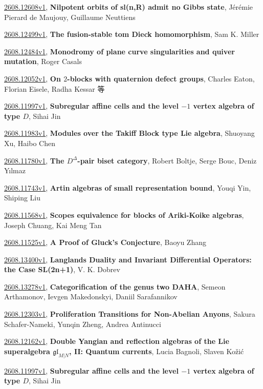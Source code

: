 \documentclass[9pt, a4paper]{article}
\theoremstyle{plain}
\theoremstyle{definition}
\theoremstyle{remark}
\newcommand{\arxiv}[3]{\href{https://arxiv.org/abs/#1}{#1}, \textbf{\textcolor{arxivblue}{#2}}, #3}
\begin{document}
\arxiv{2608.12608v1}{Nilpotent orbits of sl(n,R) admit no Gibbs state}{Jérémie Pierard de Maujouy, Guillaume Neuttiens}

\arxiv{2608.12499v1}{The fusion-stable tom Dieck homomorphism}{Sam K. Miller}

\arxiv{2608.12484v1}{Monodromy of plane curve singularities and quiver mutation}{Roger Casals}

\arxiv{2608.12052v1}{On $2$-blocks with quaternion defect groups}{Charles Eaton, Florian Eisele, Radha Kessar 等}

\arxiv{2608.11997v1}{Subregular affine cells and the level $-1$ vertex algebra of type $D$}{Sihai Jin}

\arxiv{2608.11983v1}{Modules over the Takiff Block type Lie algebra}{Shuoyang Xu, Haibo Chen}

\arxiv{2608.11780v1}{The $D^Δ$-pair biset category}{Robert Boltje, Serge Bouc, Deniz Yılmaz}

\arxiv{2608.11743v1}{Artin algebras of small representation bound}{Youqi Yin, Shiping Liu}

\arxiv{2608.11568v1}{Scopes equivalence for blocks of Ariki-Koike algebras}{Joseph Chuang, Kai Meng Tan}

\arxiv{2608.11525v1}{A Proof of Gluck's Conjecture}{Baoyu Zhang}

\arxiv{2608.13400v1}{Langlands Duality and Invariant Differential Operators: the Case SL(2n+1)}{V. K. Dobrev}

\arxiv{2608.13278v1}{Categorification of the genus two DAHA}{Semeon Arthamonov, Ievgen Makedonskyi, Daniil Sarafannikov}

\arxiv{2608.12303v1}{Proliferation Transitions for Non-Abelian Anyons}{Sakura Schafer-Nameki, Yunqin Zheng, Andrea Antinucci}

\arxiv{2608.12162v1}{Double Yangian and reflection algebras of the Lie superalgebra $\mathfrak{gl}_{M|N}$, II: Quantum currents}{Lucia Bagnoli, Slaven Kožić}

\arxiv{2608.11997v1}{Subregular affine cells and the level $-1$ vertex algebra of type $D$}{Sihai Jin}

\end{document}
